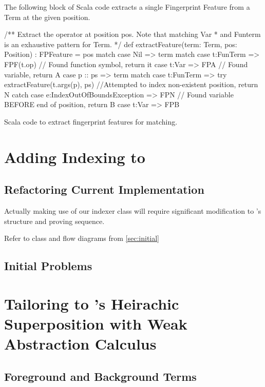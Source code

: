 The following block of Scala code extracts a single Fingerprint Feature from
a Term at the given position.
\begin{listing}[H]
\begin{scalacode}
 /** Extract the operator at position pos. Note that matching Var
   * and Funterm is an exhaustive pattern for Term. */
  def extractFeature(term: Term, pos: Position) : FPFeature = pos match {
    case Nil     => term match {
      case t:FunTerm => FPF(t.op) // Found function symbol, return it
      case t:Var     => FPA       // Found variable, return A
    }
    case p :: ps => term match {
      case t:FunTerm => try   {extractFeature(t.args(p), ps) }
                        //Attempted to index non-existent position, return N
                        catch {case e:IndexOutOfBoundsException => FPN}
      // Found variable BEFORE end of position, return B
      case t:Var     => FPB 
    }
  }
\end{scalacode}
\caption{Scala code to extract fingerprint features for matching.}
\label{lst:posextract}
\end{listing}

\section{Adding Indexing to \Beagle}

\subsection{Refactoring Current Implementation}

Actually making use of our indexer class will require significant modification
to \beagle's structure and proving sequence.

Refer to class and flow diagrams from \ref{sec:initial}

\subsection{Initial Problems}

\section{Tailoring to \Beagle's Heirachic Superposition with Weak Abstraction Calculus}
\label{sec:tailored}

\subsection{Foreground and Background Terms}

